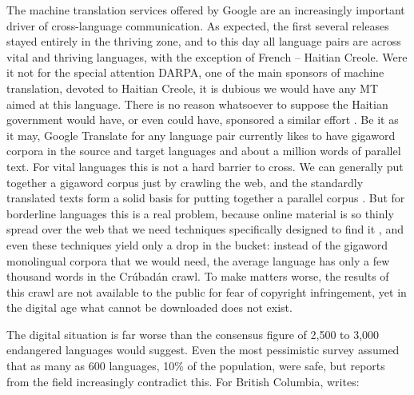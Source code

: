 \documentclass[10pt]{article}
\begin{document}
The machine translation services offered by Google are an increasingly
important driver of cross-language communication. As expected, the first
several releases stayed entirely in the thriving zone, and to this day all
language pairs are across vital and thriving languages, with the exception of
French -- Haitian Creole.  Were it not for the special attention DARPA, one of
the main sponsors of machine translation, devoted to Haitian Creole, it is
dubious we would have any MT aimed at this language. There is no reason
whatsoever to suppose the Haitian government would have, or even could have,
sponsored a similar effort \cite{Spice:2010}.  Be it as it may, Google
Translate for any language pair currently likes to have gigaword corpora in
the source and target languages and about a million words of parallel
text. For vital languages this is not a hard barrier to cross. We can
generally put together a gigaword corpus just by crawling the web, and the
standardly translated texts form a solid basis for putting together a parallel
corpus \cite{Varga:2007}.
But for borderline languages this is a real problem, because online material
is so thinly spread over the web that we need techniques specifically designed
to find it \cite{Scannell:2007}, and even these techniques yield only a drop
in the bucket: instead of the gigaword monolingual corpora that we would need, the
average language has only a few thousand words in the Cr\'ubad\'an crawl. To
make matters worse, the results of this crawl are not available to the public
for fear of copyright infringement, yet in the digital age what cannot be
downloaded does not exist.

The {\color{black} digital} situation is far worse than the consensus figure of
2,500 to 3,000 endangered languages would suggest. Even the most pessimistic
survey \cite{Krauss:1992}
assumed that as many as 600 languages, 10\% of the population, were
safe, but reports from the field increasingly contradict this. For British 
Columbia, \cite{Poser:pc} writes:
\end{document}
